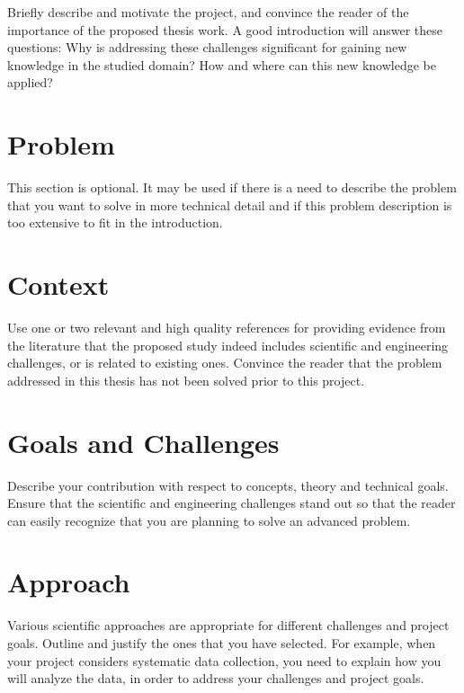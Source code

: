 \documentclass{article}
\begin{document}
Briefly describe and motivate the project, and convince the reader of the importance of the proposed thesis work. 
A good introduction will answer these questions: Why is addressing these challenges significant for gaining new knowledge 
in the studied domain? How and where can this new knowledge be applied?



\section{Problem} 



This section is optional. It may be used if there is a need to describe the problem that you want to solve in more technical 
detail and if this problem description is too extensive to fit in the introduction.




\section{Context}



Use one or two relevant and high quality references for providing evidence from the literature that the proposed study indeed 
includes scientific and engineering challenges, or is related to existing ones. Convince the reader that the problem addressed 
in this thesis has not been solved prior to this project.





\section{Goals and Challenges}



Describe your contribution with respect to concepts, theory and technical goals. Ensure that the scientific and engineering 
challenges stand out so that the reader can easily recognize that you are planning to solve an advanced problem. 


\section{Approach}



Various scientific approaches are appropriate for different challenges and project goals. Outline and justify the ones that 
you have selected. For example, when your project considers systematic data collection, you need to explain how you will analyze 
the data, in order to address your challenges and project goals.
\end{document}
